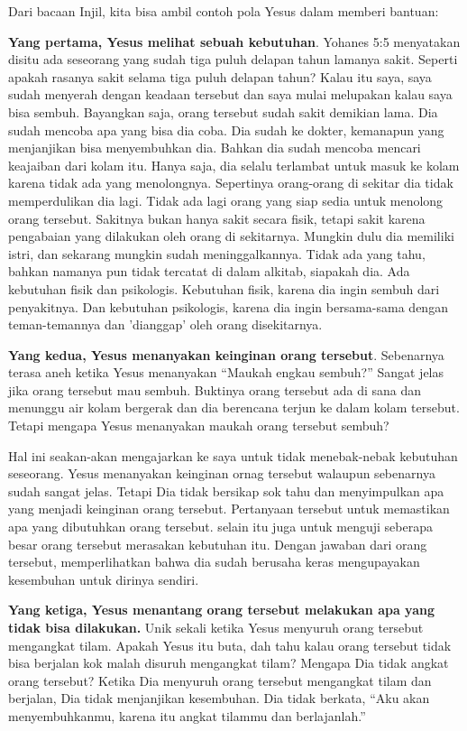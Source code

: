 \documentclass[a5paper,titlepage,12pt]{scrbook}
\begin{document}
\begin{itemize}
\begin{enumerate}[a.]
Dari bacaan Injil, kita bisa ambil contoh pola Yesus dalam memberi bantuan:

\textbf{Yang pertama, Yesus melihat sebuah kebutuhan}. Yohanes 5:5 menyatakan disitu ada seseorang yang sudah tiga puluh delapan tahun lamanya sakit. Seperti apakah rasanya sakit selama tiga puluh delapan tahun? Kalau itu saya, saya sudah menyerah dengan keadaan tersebut dan saya mulai melupakan kalau saya bisa sembuh. Bayangkan saja, orang tersebut sudah sakit demikian lama. Dia sudah mencoba apa yang bisa dia coba. Dia sudah ke dokter, kemanapun yang menjanjikan bisa menyembuhkan dia. Bahkan dia sudah mencoba mencari keajaiban dari kolam itu. Hanya saja, dia selalu terlambat untuk masuk ke kolam karena tidak ada yang menolongnya. Sepertinya orang-orang di sekitar dia tidak memperdulikan dia lagi. Tidak ada lagi orang yang siap sedia untuk menolong orang tersebut.
Sakitnya bukan hanya sakit secara fisik, tetapi sakit karena pengabaian yang dilakukan oleh orang di sekitarnya. Mungkin dulu dia memiliki istri, dan sekarang mungkin sudah meninggalkannya. Tidak ada yang tahu, bahkan namanya pun tidak tercatat di dalam alkitab, siapakah dia. Ada kebutuhan fisik dan psikologis. Kebutuhan fisik, karena dia ingin sembuh dari penyakitnya. Dan kebutuhan psikologis, karena dia ingin bersama-sama dengan teman-temannya dan 'dianggap' oleh orang disekitarnya.

\textbf{Yang kedua, Yesus menanyakan keinginan orang tersebut}. Sebenarnya terasa aneh ketika Yesus menanyakan ``Maukah engkau sembuh?'' Sangat jelas jika orang tersebut mau sembuh. Buktinya orang tersebut ada di sana dan menunggu air kolam bergerak dan dia berencana terjun ke dalam kolam tersebut. Tetapi mengapa Yesus menanyakan maukah orang tersebut sembuh?

Hal ini seakan-akan mengajarkan ke saya untuk tidak menebak-nebak kebutuhan seseorang. Yesus menanyakan keinginan ornag tersebut walaupun sebenarnya sudah sangat jelas. Tetapi Dia tidak bersikap sok tahu dan menyimpulkan apa yang menjadi keinginan orang tersebut. Pertanyaan tersebut untuk memastikan apa yang dibutuhkan orang tersebut. selain itu juga untuk menguji seberapa besar orang tersebut merasakan kebutuhan itu. Dengan jawaban dari orang tersebut, memperlihatkan bahwa dia sudah berusaha keras mengupayakan kesembuhan untuk dirinya sendiri.

\textbf{Yang ketiga, Yesus menantang orang tersebut melakukan apa yang tidak bisa dilakukan.} Unik sekali ketika Yesus menyuruh orang tersebut mengangkat tilam. Apakah Yesus itu buta, dah tahu kalau orang tersebut tidak bisa berjalan kok malah disuruh mengangkat tilam? Mengapa Dia tidak angkat orang tersebut? Ketika Dia menyuruh orang tersebut mengangkat tilam dan berjalan, Dia tidak menjanjikan kesembuhan. Dia tidak berkata, ``Aku akan menyembuhkanmu, karena itu angkat tilammu dan berlajanlah.''


\end{enumerate}
\end{itemize}
\end{document}
